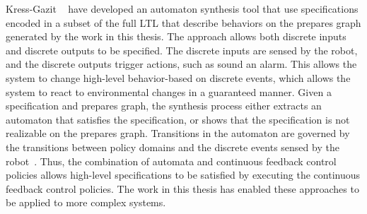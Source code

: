 Kress-Gazit \ea~\cite{hadas_07} have developed an automaton synthesis tool that use
specifications encoded in a subset of the full LTL that describe behaviors on the
prepares graph generated by the work in this thesis.  The approach allows both
discrete inputs and discrete outputs to be specified.  The discrete inputs are sensed
by the robot, and the discrete outputs trigger actions, such as sound an alarm.  This
allows the system to change high-level behavior-based on discrete events, which
allows the system to react to environmental changes in a guaranteed manner.
Given a specification and prepares graph, the synthesis process either extracts an
automaton that satisfies the specification, or shows that the specification is not
realizable on the prepares graph.  Transitions in the automaton are governed by the
transitions between policy domains and the discrete events sensed by the
robot~\cite{dcchkg_07}.  Thus, the combination of automata and continuous feedback
control policies allows high-level specifications to be satisfied by executing the
continuous feedback control policies.  The work in this thesis has enabled these
approaches to be applied to more complex systems.




